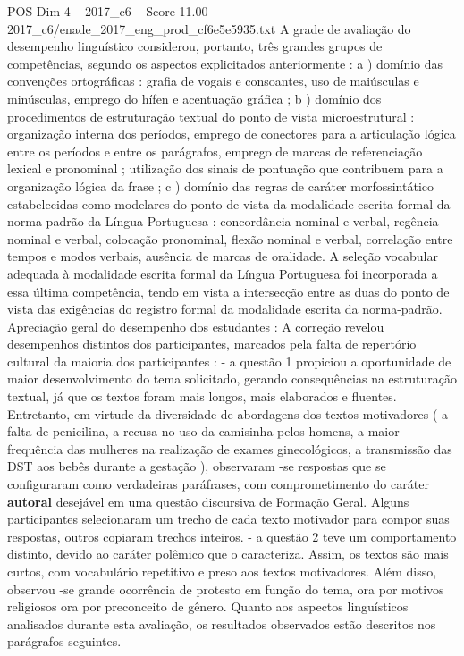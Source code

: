 \begin{textsample}{POS Dim 4 – 2017\_c6 – Score 11.00 – 2017\_c6/enade\_2017\_eng\_prod\_cf6e5e5935.txt}
A grade de avaliação do desempenho linguístico considerou, portanto, três grandes grupos de competências, segundo os aspectos explicitados anteriormente : a ) domínio das convenções ortográficas : grafia de vogais e consoantes, uso de maiúsculas e minúsculas, emprego do hífen e acentuação gráfica ; b ) domínio dos procedimentos de estruturação textual do ponto de vista microestrutural : organização interna dos períodos, emprego de conectores para a articulação lógica entre os períodos e entre os parágrafos, emprego de marcas de referenciação lexical e pronominal ; utilização dos sinais de pontuação que contribuem para a organização lógica da frase ; c ) domínio das regras de caráter morfossintático estabelecidas como modelares do ponto de vista da modalidade escrita formal da norma-padrão da Língua Portuguesa : concordância nominal e verbal, regência nominal e verbal, colocação pronominal, flexão nominal e verbal, correlação entre tempos e modos verbais, ausência de marcas de oralidade.
A seleção vocabular adequada à modalidade escrita formal da Língua Portuguesa foi incorporada a essa última competência, tendo em vista a intersecção entre as duas do ponto de vista das exigências do registro formal da modalidade escrita da norma-padrão.
Apreciação geral do desempenho dos estudantes : A correção revelou desempenhos distintos dos participantes, marcados pela falta de repertório cultural da maioria dos participantes : - a questão 1 propiciou a oportunidade de maior desenvolvimento do tema solicitado, gerando consequências na estruturação textual, já que os textos foram mais longos, mais elaborados e fluentes.
Entretanto, em virtude da diversidade de abordagens dos textos motivadores ( a falta de penicilina, a recusa no uso da camisinha pelos homens, a maior frequência das mulheres na realização de exames ginecológicos, a transmissão das DST aos bebês durante a gestação ), observaram -se respostas que se configuraram como verdadeiras paráfrases, com comprometimento do caráter \textbf{autoral} desejável em uma questão discursiva de Formação Geral.
Alguns participantes selecionaram um trecho de cada texto motivador para compor suas respostas, outros copiaram trechos inteiros. - a questão 2 teve um comportamento distinto, devido ao caráter polêmico que o caracteriza.
Assim, os textos são mais curtos, com vocabulário repetitivo e preso aos textos motivadores.
Além disso, observou -se grande ocorrência de protesto em função do tema, ora por motivos religiosos ora por preconceito de gênero.
Quanto aos aspectos linguísticos analisados durante esta avaliação, os resultados observados estão descritos nos parágrafos seguintes.

\end{textsample}
